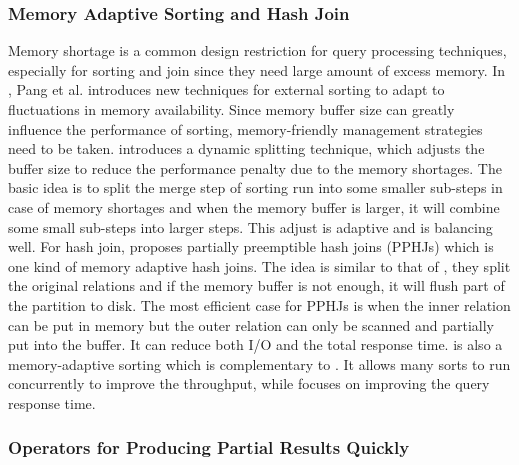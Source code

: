 \subsubsection{Memory Adaptive Sorting and Hash Join}

Memory shortage is a common design restriction for query processing techniques, especially for sorting and join since they need large amount of excess memory. In \cite{Pang93memory-adaptiveexternal}, Pang et al. introduces new techniques for external sorting to adapt to fluctuations in memory availability. Since memory buffer size can greatly influence the performance of sorting, memory-friendly management strategies need to be taken. \cite{Pang93memory-adaptiveexternal} introduces a dynamic splitting technique, which adjusts the buffer size to reduce the performance penalty due to the memory shortages. The basic idea is to split the merge step of sorting run into some smaller sub-steps in case of memory shortages and when the memory buffer is larger, it will combine some small sub-steps into larger steps. This adjust is adaptive and is balancing well. For hash join, \cite{Pang:1993:PPH:170035.170051} proposes partially preemptible hash joins (PPHJs) which is one kind of memory adaptive hash joins. The idea is similar to that of \cite{Pang93memory-adaptiveexternal}, they split the original relations and if the memory buffer is not enough, it will flush part of the partition to disk. The most efficient case for PPHJs is when the inner relation can be put in memory but the outer relation can only be scanned and partially put into the buffer. It can reduce both I/O and the total response time. \cite{Zhang:1997:DMA:645923.671006} is also a memory-adaptive sorting which is complementary to \cite{Pang93memory-adaptiveexternal}. It allows many sorts to run concurrently to improve the throughput, while \cite{Pang93memory-adaptiveexternal} focuses on improving the query response time.


\subsubsection{Operators for Producing Partial Results Quickly}

